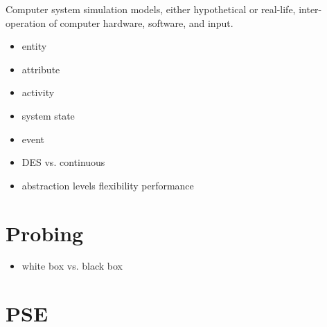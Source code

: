 Computer system simulation models, either hypothetical or real-life, inter-operation of computer hardware, software, and input.


\begin{itemize}
\item entity
\item attribute
\item activity
\item system state
\item event
\end{itemize}

\begin{itemize}
\item DES vs. continuous
\end{itemize}

\begin{itemize}
\item abstraction levels
\subitem flexibility
\subitem performance
\end{itemize}

\section{Probing}
\begin{itemize}
\item white box vs. black box
\end{itemize}

\section{PSE}


